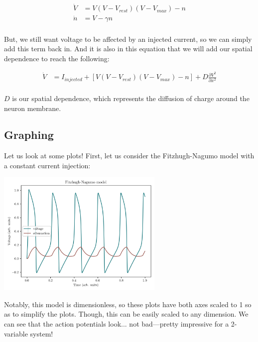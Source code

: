 \begin{equation} \label{fn4}
\begin{split}
    \dot{V} &= V(V - V_{rest})(V - V_{max}) - n\\ 
    \dot{n} &= V - \gamma n\\
\end{split}
\end{equation}

But, we still want voltage to be affected by an injected current, so we can simply add this term back in. And it is also in this equation that we will add our spatial dependence to reach the following: 

\begin{equation} \label{fn5}
\begin{split}
    \dot{V} &= I_{injected} + [V(V - V_{rest})(V - V_{max}) - n] +  D\frac{\partial V^2}{\partial x^2}\\
\end{split}
\end{equation}

$D$ is our spatial dependence, which represents the diffusion of charge around the neuron membrane.\newline

\subsection{Graphing}

Let us look at some plots! First, let us consider the Fitzhugh-Nagumo model with a constant current injection:

\begin{center}
\includegraphics[width=0.6\textwidth]{images/models/fhn1.png}
\end{center}

Notably, this model is dimensionless, so these plots have both axes scaled to 1 so as to simplify the plots. Though, this can be easily scaled to any dimension. We can see that the action potentials look... not bad---pretty impressive for a 2-variable system!\newline

